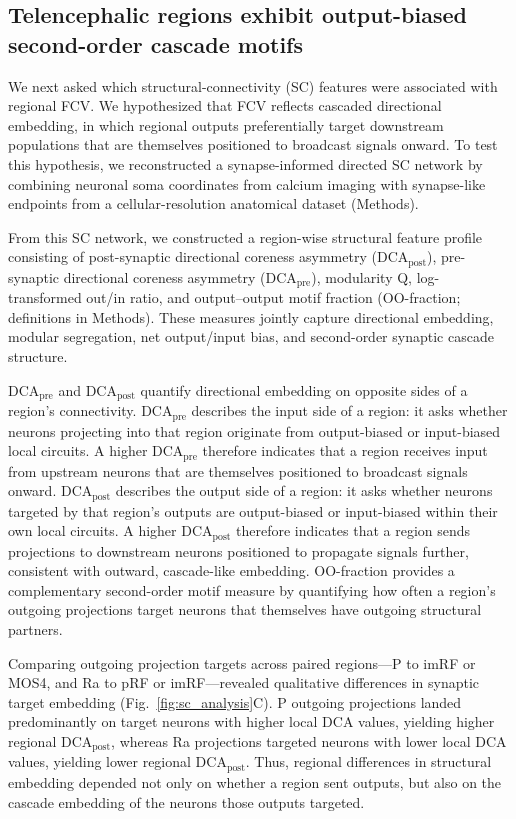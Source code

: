 \documentclass[9pt,twocolumn,twoside]{pnas-new}
\begin{document}
\subsection*{Telencephalic regions exhibit output-biased second-order cascade motifs}

We next asked which structural-connectivity (SC) features were associated with regional FCV. We hypothesized that FCV reflects cascaded directional embedding, in which regional outputs preferentially target downstream populations that are themselves positioned to broadcast signals onward. To test this hypothesis, we reconstructed a synapse-informed directed SC network by combining neuronal soma coordinates from calcium imaging \citep{chen2018brain} with synapse-like endpoints from a cellular-resolution anatomical dataset \citep{kunst2019cellular} (Methods).

From this SC network, we constructed a region-wise structural feature profile consisting of post-synaptic directional coreness asymmetry ($\mathrm{DCA}_{\mathrm{post}}$), pre-synaptic directional coreness asymmetry ($\mathrm{DCA}_{\mathrm{pre}}$), modularity Q, log-transformed out/in ratio, and output--output motif fraction (OO-fraction; definitions in Methods). These measures jointly capture directional embedding, modular segregation, net output/input bias, and second-order synaptic cascade structure.

$\mathrm{DCA}_{\mathrm{pre}}$ and $\mathrm{DCA}_{\mathrm{post}}$ quantify directional embedding on opposite sides of a region's connectivity.
$\mathrm{DCA}_{\mathrm{pre}}$ describes the input side of a region: it asks whether neurons projecting into that region originate from output-biased or input-biased local circuits.
A higher $\mathrm{DCA}_{\mathrm{pre}}$ therefore indicates that a region receives input from upstream neurons that are themselves positioned to broadcast signals onward.
$\mathrm{DCA}_{\mathrm{post}}$ describes the output side of a region: it asks whether neurons targeted by that region's outputs are output-biased or input-biased within their own local circuits.
A higher $\mathrm{DCA}_{\mathrm{post}}$ therefore indicates that a region sends projections to downstream neurons positioned to propagate signals further, consistent with outward, cascade-like embedding.
OO-fraction provides a complementary second-order motif measure by quantifying how often a region's outgoing projections target neurons that themselves have outgoing structural partners.

Comparing outgoing projection targets across paired regions---P to imRF or MOS4, and Ra to pRF or imRF---revealed qualitative differences in synaptic target embedding (Fig.~\ref{fig:sc_analysis}C).
P outgoing projections landed predominantly on target neurons with higher local DCA values, yielding higher regional $\mathrm{DCA}_{\mathrm{post}}$, whereas Ra projections targeted neurons with lower local DCA values, yielding lower regional $\mathrm{DCA}_{\mathrm{post}}$.
Thus, regional differences in structural embedding depended not only on whether a region sent outputs, but also on the cascade embedding of the neurons those outputs targeted.
\end{document}

